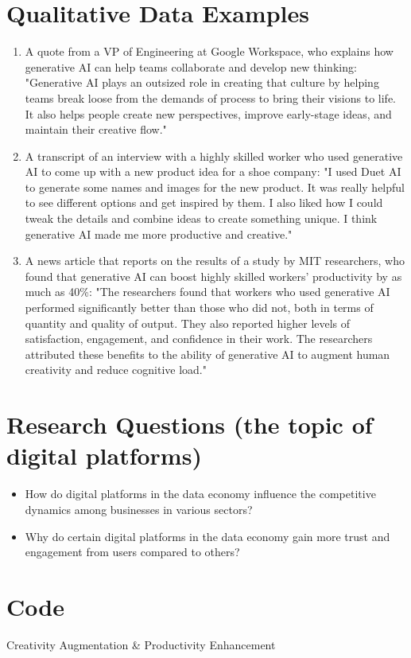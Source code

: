 \documentclass[UTF8,a4paper,AutoFakeBold,AutoFakeSlant]{article}
\begin{document}
\section{Qualitative Data Examples}

\begin{enumerate}
    \item A quote from a VP of Engineering at Google Workspace, who explains how generative AI can help teams collaborate and develop new thinking: "Generative AI plays an outsized role in creating that culture by helping teams break loose from the demands of process to bring their visions to life. It also helps people create new perspectives, improve early-stage ideas, and maintain their creative flow."\cite{decremer2023}
    \item A transcript of an interview with a highly skilled worker who used generative AI to come up with a new product idea for a shoe company: "I used Duet AI to generate some names and images for the new product. It was really helpful to see different options and get inspired by them. I also liked how I could tweak the details and combine ideas to create something unique. I think generative AI made me more productive and creative."\cite{webpage}
    \item A news article that reports on the results of a study by MIT researchers, who found that generative AI can boost highly skilled workers' productivity by as much as 40\%: "The researchers found that workers who used generative AI performed significantly better than those who did not, both in terms of quantity and quality of output. They also reported higher levels of satisfaction, engagement, and confidence in their work. The researchers attributed these benefits to the ability of generative AI to augment human creativity and reduce cognitive load."\cite{anewstudy}
\end{enumerate}



\section{Research Questions (the topic of digital platforms)}

\begin{itemize}
    \item How do digital platforms in the data economy influence the competitive dynamics among businesses in various sectors?
    \item Why do certain digital platforms in the data economy gain more trust and engagement from users compared to others?
\end{itemize}


\section{Code}

Creativity Augmentation \&
Productivity Enhancement








% 


\end{document}
